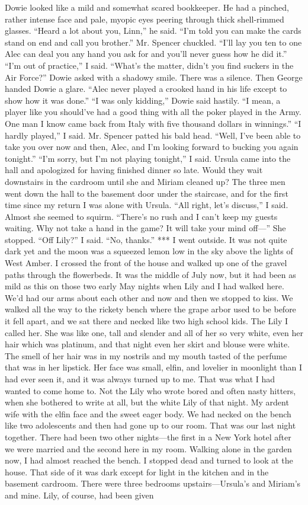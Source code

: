 \documentclass{novel}
\begin{document}
Dowie looked like a mild and somewhat scared bookkeeper. He had a pinched, rather intense face and pale, myopic eyes peering through thick shell-rimmed glasses. “Heard a lot about you, Linn,” he said. “I’m told you can make the cards stand on end and call you brother.” Mr. Spencer chuckled. “I’ll lay you ten to one Alec can deal you any hand you ask for and you’ll never guess how he did it.” “I’m out of practice,” I said. “What’s the matter, didn’t you find suckers in the Air Force?” Dowie asked with a shadowy smile. There was a silence. Then George handed Dowie a glare. “Alec never played a crooked hand in his life except to show how it was done.” “I was only kidding,” Dowie said hastily. “I mean, a player like you should’ve had a good thing with all the poker played in the Army. One man I know came back from Italy with five thousand dollars in winnings.” “I hardly played,” I said. Mr. Spencer patted his bald head. “Well, I’ve been able to take you over now and then, Alec, and I’m looking forward to bucking you again tonight.” “I’m sorry, but I’m not playing tonight,” I said. Ursula came into the hall and apologized for having finished dinner so late. Would they wait downstairs in the cardroom until she and Miriam cleaned up? The three men went down the hall to the basement door under the staircase, and for the first time since my return I was alone with Ursula. “All right, let’s discuss,” I said. Almost she seemed to squirm. “There’s no rush and I can’t keep my guests waiting. Why not take a hand in the game? It will take your mind off—” She stopped. “Off Lily?” I said. “No, thanks.” *** I went outside. It was not quite dark yet and the moon was a squeezed lemon low in the sky above the lights of West Amber. I crossed the front of the house and walked up one of the gravel paths through the flowerbeds. It was the middle of July now, but it had been as mild as this on those two early May nights when Lily and I had walked here. We’d had our arms about each other and now and then we stopped to kiss. We walked all the way to the rickety bench where the grape arbor used to be before it fell apart, and we sat there and necked like two high school kids. The Lily I called her. She was like one, tall and slender and all of her so very white, even her hair which was platinum, and that night even her skirt and blouse were white. The smell of her hair was in my nostrils and my mouth tasted of the perfume that was in her lipstick. Her face was small, elfin, and lovelier in moonlight than I had ever seen it, and it was always turned up to me. That was what I had wanted to come home to. Not the Lily who wrote bored and often nasty hitters, when she bothered to write at all, but the white Lily of that night. My ardent wife with the elfin face and the sweet eager body. We had necked on the bench like two adolescents and then had gone up to our room. That was our last night together. There had been two other nights—the first in a New York hotel after we were married and the second here in my room. Walking alone in the garden now, I had almost reached the bench. I stopped dead and turned to look at the house. That side of it was dark except for light in the kitchen and in the basement cardroom. There were three bedrooms upstairs—Ursula’s and Miriam’s and mine. Lily, of course, had been given 
\end{document}
